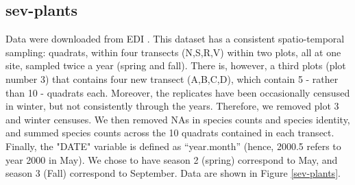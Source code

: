 \documentclass[11pt, oneside]{article}
\begin{document}
\subsection{sev-plants}
Data were downloaded from EDI \citep{sev-plants}.
This dataset has a consistent spatio-temporal sampling: quadrats, within four transects (N,S,R,V) within two plots, all at one site, sampled twice a year (spring and fall). 
There is, however, a third plots (plot number 3) that contains four new transect (A,B,C,D), which contain 5 - rather than 10 - quadrats each. 
Moreover, the replicates have been occasionally censused in winter, but not consistently through the years. 
Therefore, we removed plot 3 and winter censuses.
We then removed NAs in species counts and species identity, and summed species counts across the 10 quadrats contained in each transect. 
Finally, the "DATE" variable is defined as ``year.month'' (hence, 2000.5 refers to year 2000 in May). 
We chose to have season 2 (spring) correspond to May, and season 3 (Fall) correspond to September.
Data are shown in Figure \ref{sev-plants}.
\end{document}
